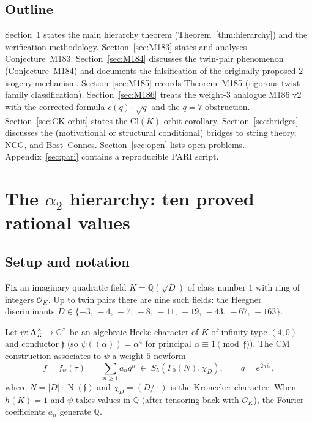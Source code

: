 \documentclass[12pt]{amsart}
\theoremstyle{definition}
\DeclareMathOperator{\Nm}{N}
\newcommand{\Q}{\mathbb{Q}}
\newcommand{\C}{\mathbb{C}}
\newcommand{\OK}{\mathcal{O}_K}
\newcommand{\ff}{\mathfrak{f}}
\begin{document}
\subsection{Outline}

Section~\ref{sec:hierarchy} states the main hierarchy theorem
(Theorem~\ref{thm:hierarchy}) and the verification methodology.
Section~\ref{sec:M183} states and analyses Conjecture~M183.
Section~\ref{sec:M184} discusses the twin-pair phenomenon
(Conjecture~M184) and documents the falsification of the originally
proposed $2$-isogeny mechanism.
Section~\ref{sec:M185} records Theorem~M185 (rigorous twist-family
classification).
Section~\ref{sec:M186} treats the weight-$3$ analogue M186 v2 with the
corrected formula $c(q)\cdot\sqrt{q}$ and the $q=7$ obstruction.
Section~\ref{sec:CK-orbit} states the Cl$(K)$-orbit corollary.
Section~\ref{sec:bridges} discusses the (motivational or structural
conditional) bridges to string theory, NCG, and Bost--Connes.
Section~\ref{sec:open} lists open problems.
Appendix~\ref{sec:pari} contains a reproducible PARI script.

\section{The $\alpha_2$ hierarchy: ten proved rational values}
\label{sec:hierarchy}

\subsection{Setup and notation}
\label{ssec:setup}

Fix an imaginary quadratic field $K = \Q(\sqrt{D})$ of class number $1$
with ring of integers $\OK$. Up to twin pairs there are nine such fields:
the Heegner discriminants
$D \in \{-3,\,-4,\,-7,\,-8,\,-11,\,-19,\,-43,\,-67,\,-163\}$.

Let $\psi : \mathbf{A}_K^\times \to \C^\times$ be an algebraic Hecke
character of $K$ of infinity type $(4,0)$ and conductor $\ff$
(so $\psi((\alpha)) = \alpha^4$ for principal $\alpha \equiv 1
\pmod{\ff}$). The CM construction associates to $\psi$ a weight-$5$
newform
\[
  f = f_\psi(\tau) \;=\; \sum_{n \ge 1} a_n q^n
   \;\in\; S_5(\Gamma_0(N), \chi_D),\qquad q = e^{2\pi i \tau},
\]
where $N = |D| \cdot \Nm(\ff)$ and $\chi_D = (D/\cdot)$ is the
Kronecker character. When $h(K) = 1$ and $\psi$ takes values in $\Q$ (after
tensoring back with $\OK$), the Fourier coefficients $a_n$ generate $\Q$.
\end{document}
